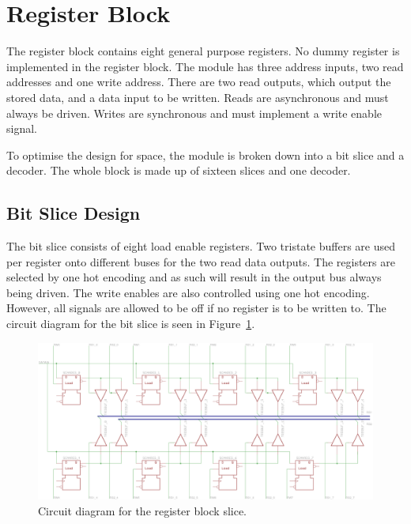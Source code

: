 
\section{Register Block}

The register block contains eight general purpose registers. 
No dummy register is implemented in the register block. 
The module has three address inputs, two read addresses and one write address. 
There are two read outputs, which output the stored data, and a data input to be written. 
Reads are asynchronous and must always be driven. 
Writes are synchronous and must implement a write enable signal. 

To optimise the design for space, the module is broken down into a bit slice and a decoder. 
The whole block is made up of sixteen slices and one decoder. 

\subsection{Bit Slice Design}

The bit slice consists of eight load enable registers. 
Two tristate buffers are used per register onto different buses for the two read data outputs. 
The registers are selected by one hot encoding and as such will result in the output bus always being driven. 
The write enables are also controlled using one hot encoding. 
However, all signals are allowed to be off if no register is to be written to.
The circuit diagram for the bit slice is seen in Figure~\ref{fig:reg:slice}.

\begin{figure}
\centering
\includegraphics[angle=90,height=\textheight]{../../eagle/regBlock/regBlock_slice.png}
\caption{Circuit diagram for the register block slice.}
\label{fig:reg:slice}
\end{figure}



